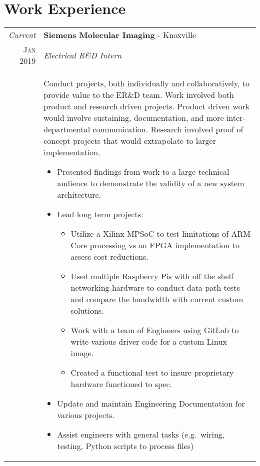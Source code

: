 \documentclass[a4paper,11pt]{article}
\begin{document}
\section{Work Experience}
\begin{tabularx}{\textwidth}{r|X}
   \emph{Current} & \textbf{Siemens Molecular Imaging} \-- Knoxville\\
   \textsc{Jan 2019} & \emph{Electrical R\&D Intern}\\
   & \small{Conduct projects, both individually and collaboratively, to provide value to the ER\&D team.
            Work involved both product and research driven projects.
            Product driven work would involve sustaining, documentation, and more inter-departmental communication.
            Research involved proof of concept projects that would extrapolate to larger implementation.
      \begin{itemize}[leftmargin=20pt,topsep=1pt,itemsep=1pt,partopsep=0pt, parsep=1pt]
         \item Presented findings from work to a large technical audience to demonstrate the validity of a new system architecture.
         \item Lead long term projects:
            \begin{itemize}[leftmargin=20pt,topsep=1pt,itemsep=1pt,partopsep=0pt, parsep=1pt]
               \item Utilize a Xilinx MPSoC to test limitations of ARM Core processing vs an FPGA implementation to assess cost reductions.
               \item Used multiple Raspberry Pis with off the shelf networking hardware to conduct data path tests and compare the bandwidth with current custom solutions.
               \item Work with a team of Engineers using GitLab to write various driver code for a custom Linux image.
               \item Created a functional test to insure proprietary hardware functioned to spec.
            \end{itemize}
         \item Update and maintain Engineering Documentation for various projects.
         \item Assist engineers with general tasks (e.g.\ wiring, testing, Python scripts to process files)
      \vspace{-0.5cm}
      \end{itemize}}\\
\end{tabularx}
\end{document}
